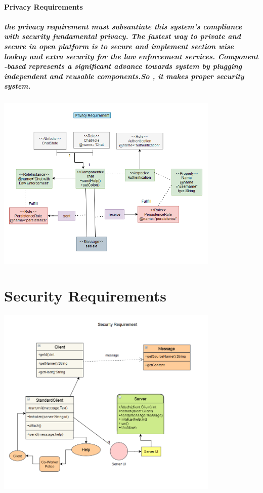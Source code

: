 \documentclass{article}
\begin{document}
\paragraph{Privacy Requirements}
\subparagraph{the privacy requirement must subsantiate this system's compliance with security fundamental privacy.
The fastest way to private and secure in open platform is to secure and implement section wise lookup and extra security for the law enforcement services.
Component -based represents a significant advance towards system by plugging independent and reusable components.So , it makes proper security system.}
\includegraphics[width=0.8\textwidth]{Privacy_Requirement.png}




\newpage

\section{Security Requirements}
\includegraphics[width=0.8\textwidth]{Security_Requirement.png}
\end{document}
